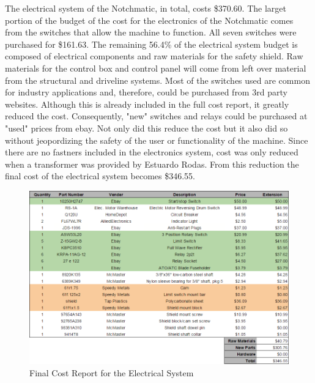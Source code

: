 The electrical system of the Notchmatic, in total, costs \$370.60. The larget portion of the budget of the cost for the electronics of the Notchmatic comes from the switches that allow the machine to function. All seven switches were purchased for \$161.63. The remaining 56.4\% of the electrical system budget is composed of electrical components and raw materials for the safety shield. Raw materials for the control box and control panel will come from left over material from the structural and driveline systems. Most of the switches used are common for industry applications and, therefore, could be purchased from 3rd party websites. Although this is already included in the full cost report, it greatly reduced the cost. Consequently, "new" switches and relays could be purchased at "used" prices from ebay. Not only did this reduce the cost but it also did so without jeopordizing the safety of the user or functionality of the machine.
Since there are no fastners included in the electronics system, cost was only reduced when a transformer was provided by Estuardo Rodas. From this reduction the final cost of the electrical system becomes \$346.55.

\begin{figure}[htp]
    \centering
    \includegraphics[width=1.0\textwidth]{./fall-report pictures/Chapter4-BillofMaterials/FCRE}
    \caption{Final Cost Report for the Electrical System}
    \label{fig:FCRE}
\end{figure}